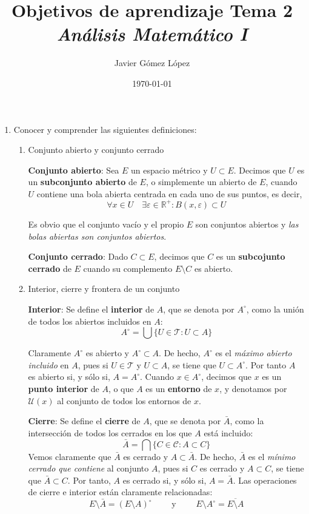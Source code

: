 \documentclass[a4paper, 12pt]{article}
\title{\textbf{Objetivos de aprendizaje Tema 2} \\ \textit{Análisis Matemático I}}
\author{Javier Gómez López}
\date{\today}
\begin{document}
\maketitle

\begin{enumerate}[label=\textbf{\arabic*}.]

\item Conocer y comprender las siguientes definiciones:
	\begin{enumerate}[label=\textit{\alph*})]
	
	\item Conjunto abierto y conjunto cerrado

\textbf{Conjunto abierto}: Sea \(E\) un espacio métrico y \(U \subset E\). Decimos que \(U\) es un \textbf{subconjunto abierto} de \(E\), o simplemente un abierto de \(E\), cuando \(U\) contiene una bola abierta centrada en cada uno de sus puntos, es decir,
\[
	\forall x \in U \quad \exists \varepsilon \in \mathbb{R}^+ : B(x, \varepsilon) \subset U
\]

Es obvio que el conjunto vacío y el propio \(E\) son conjuntos abiertos y \textit{las bolas abiertas son conjuntos abiertos}.

\par

\textbf{Conjunto cerrado}: Dado \(C \subset E\), decimos que \(C\) es un \textbf{subcojunto cerrado} de \(E\) cuando su complemento \(E \setminus C\) es abierto. 

\bigskip

	\item Interior, cierre y frontera de un conjunto

\textbf{Interior}: Se define el \textbf{interior} de \(A\), que se denota por \(A^{\circ}\), como la unión de todos los abiertos incluidos en \(A\):
\[
	A^{\circ} = \bigcup \{ U \in \mathcal{T} : U \subset A \}
\]	

Claramente \(A^{\circ}\) es abierto y \(A^{\circ} \subset A\). De hecho, \(A^{\circ}\) es el \textit{máximo abierto incluido} en \(A\), pues si \(U \in \mathcal{T}\) y \(U \subset A\), se tiene que \(U \subset A^{\circ}\). Por tanto \(A\) es abierto si, y sólo si, \(A = A^{\circ}\). Cuando \(x \in A^{\circ}\), decimos que \(x\) es un \textbf{punto interior} de \(A\), o que \(A\) es un \textbf{entorno} de \(x\), y denotamos por \(\mathcal{U}(x)\) al conjunto de todos los entornos de \(x\).

\medskip

\textbf{Cierre}: Se define el \textbf{cierre} de \(A\), que se denota por \(\bar{A}\), como la intersección de todos los cerrados en los que \(A\) está incluido:
\[
	\bar{A} = \bigcap \{ C \in \mathcal{C} : A \subset C \}
\]
Vemos claramente que \(\bar{A}\) es cerrado y \(A \subset \bar{A}\). De hecho, \(\bar{A}\) es el \textit{mínimo cerrado que contiene} al conjunto \(A\), pues si \(C\) es cerrado y \(A \subset C\), se tiene que \(\bar{A} \subset C\). Por tanto, \(A\) es cerrado si, y sólo si, \(A = \bar{A}\). Las operaciones de cierre e interior están claramente relacionadas:
\[
	E \setminus \bar{A} = (E \setminus A)^{\circ} \qquad \text{ y } \qquad E \setminus A^{\circ} = \overline{E \setminus A}
\]


\end{enumerate}
\end{enumerate}
\end{document}
